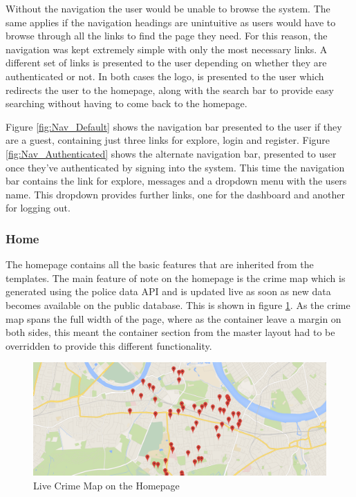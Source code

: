 Without the navigation the user would be unable to browse the system. The same applies if the navigation headings are unintuitive as users would have to browse through all the links to find the page they need. For this reason, the navigation was kept extremely simple with only the most necessary links. A different set of links is presented to the user depending on whether they are authenticated or not. In both cases the logo, is presented to the user which redirects the user to the homepage, along with the search bar to provide easy searching without having to come back to the homepage.

Figure \ref{fig:Nav_Default} shows the navigation bar presented to the user if they are a guest, containing just three links for explore, login and register. Figure \ref{fig:Nav_Authenticated} shows the alternate navigation bar, presented to user once they've authenticated by signing into the system. This time the navigation bar contains the link for explore, messages and a dropdown menu with the users name. This dropdown provides further links, one for the dashboard and another for logging out.


\subsubsection{Home}
The homepage contains all the basic features that are inherited from the templates. The main feature of note on the homepage is the crime map which is generated using the police data API and is updated live as soon as new data becomes available on the public database. This is shown in figure \ref{fig:Home_Map}. As the crime map spans the full width of the page, where as the container leave a margin on both sides, this meant the container section from the master layout had to be overridden to provide this different functionality.

\begin{figure}[H]
	\centering
	\includegraphics[width=1.0\textwidth]{images/Frisk/Home_Map}
	\caption{Live Crime Map on the Homepage} \label{fig:Home_Map}
\end{figure}


